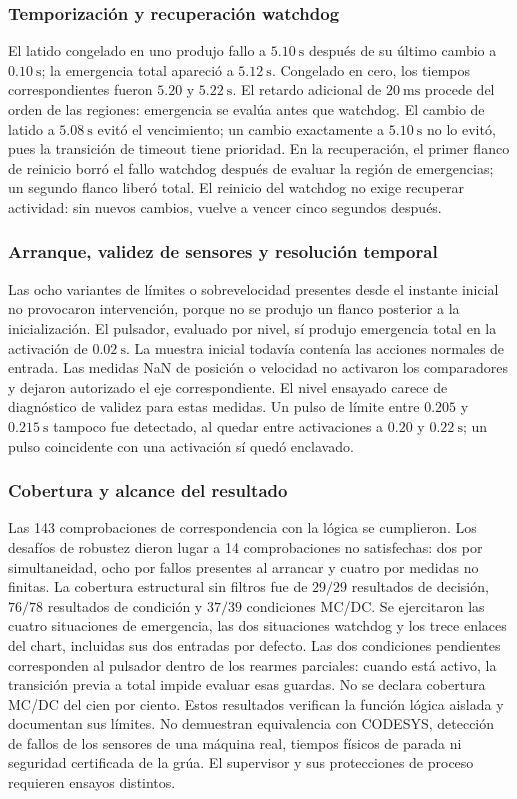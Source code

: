 \subsubsection{Temporización y recuperación watchdog}
El latido congelado en uno produjo fallo a $5.10~\mathrm{s}$ después de su último cambio a $0.10~\mathrm{s}$; la emergencia total apareció a $5.12~\mathrm{s}$. Congelado en cero, los tiempos correspondientes fueron $5.20$ y $5.22~\mathrm{s}$. El retardo adicional de $20~\mathrm{ms}$ procede del orden de las regiones: emergencia se evalúa antes que watchdog.
El cambio de latido a $5.08~\mathrm{s}$ evitó el vencimiento; un cambio exactamente a $5.10~\mathrm{s}$ no lo evitó, pues la transición de timeout tiene prioridad. En la recuperación, el primer flanco de reinicio borró el fallo watchdog después de evaluar la región de emergencias; un segundo flanco liberó total. El reinicio del watchdog no exige recuperar actividad: sin nuevos cambios, vuelve a vencer cinco segundos después.

\subsubsection{Arranque, validez de sensores y resolución temporal}
Las ocho variantes de límites o sobrevelocidad presentes desde el instante inicial no provocaron intervención, porque no se produjo un flanco posterior a la inicialización. El pulsador, evaluado por nivel, sí produjo emergencia total en la activación de $0.02~\mathrm{s}$. La muestra inicial todavía contenía las acciones normales de entrada.
Las medidas NaN de posición o velocidad no activaron los comparadores y dejaron autorizado el eje correspondiente. El nivel ensayado carece de diagnóstico de validez para estas medidas. Un pulso de límite entre $0.205$ y $0.215~\mathrm{s}$ tampoco fue detectado, al quedar entre activaciones a $0.20$ y $0.22~\mathrm{s}$; un pulso coincidente con una activación sí quedó enclavado.

\subsubsection{Cobertura y alcance del resultado}
Las 143 comprobaciones de correspondencia con la lógica se cumplieron. Los desafíos de robustez dieron lugar a 14 comprobaciones no satisfechas: dos por simultaneidad, ocho por fallos presentes al arrancar y cuatro por medidas no finitas. La cobertura estructural sin filtros fue de $29/29$ resultados de decisión, $76/78$ resultados de condición y $37/39$ condiciones MC/DC. Se ejercitaron las cuatro situaciones de emergencia, las dos situaciones watchdog y los trece enlaces del chart, incluidas sus dos entradas por defecto. Las dos condiciones pendientes corresponden al pulsador dentro de los rearmes parciales: cuando está activo, la transición previa a total impide evaluar esas guardas. No se declara cobertura MC/DC del cien por ciento.
Estos resultados verifican la función lógica aislada y documentan sus límites. No demuestran equivalencia con CODESYS, detección de fallos de los sensores de una máquina real, tiempos físicos de parada ni seguridad certificada de la grúa. El supervisor y sus protecciones de proceso requieren ensayos distintos.

